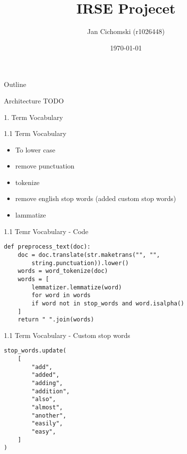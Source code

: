 \documentclass{beamer}
\title{IRSE Projecet}
\author{Jan Cichomski (r1026448)}
\date{\today}
\begin{document}
\begin{frame}
  \titlepage
\end{frame}

\begin{frame}{Outline}
  \tableofcontents
\end{frame}
\begin{frame}{Architecture}
  TODO
\end{frame}

\begin{frame}{1. Term Vocabulary}

\end{frame}

\begin{frame}{1.1 Term Vocabulary}
  \begin{itemize}
    \item To lower case
    \item remove punctuation
    \item tokenize
    \item remove english stop words (added custom stop words)
    \item lammatize
  \end{itemize}
\end{frame}

\begin{frame}[fragile]{1.1 Temr Vocabulary - Code}
    \begin{verbatim}
def preprocess_text(doc):
    doc = doc.translate(str.maketrans("", "",
        string.punctuation)).lower()
    words = word_tokenize(doc)
    words = [
        lemmatizer.lemmatize(word)
        for word in words
        if word not in stop_words and word.isalpha()
    ]
    return " ".join(words)
    \end{verbatim}
\end{frame}
\begin{frame}[fragile]{1.1 Term Vocabulary - Custom stop words}
    \begin{verbatim}
stop_words.update(
    [
        "add",
        "added",
        "adding",
        "addition",
        "also",
        "almost",
        "another",
        "easily",
        "easy",
    ]
)
    \end{verbatim}
\end{frame}
\end{document}
